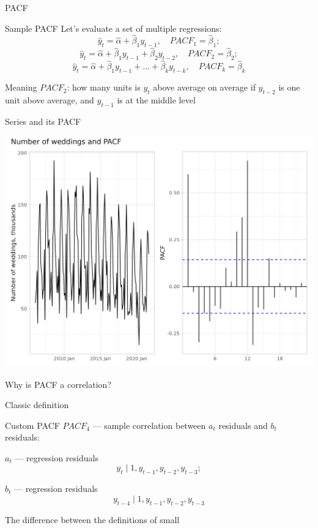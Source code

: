 \begin{frame}{PACF}
	
	\begin{block}{Sample PACF}
		Let's evaluate a set of multiple regressions:
		\[
		\hat y_t = \hat\alpha + \hat\beta_1 y_{t-1}, \quad PACF_1 = \hat\beta_1;
		\]
		\pause
		\[
		\hat y_t = \hat\alpha + \hat\beta_1 y_{t-1} + \hat\beta_2 y_{t-2}, \quad PACF_2 = \hat\beta_2;
		\]
		\pause
		\[
		\hat y_t = \hat\alpha + \hat\beta_1 y_{t-1} + \ldots + \hat\beta_k y_{t-k}, \quad PACF_k = \hat\beta_k
		\]
	\end{block}
	
	\pause
	\alert{Meaning}
	$PACF_2$: how many units is $y_t$ above average on average if $y_{t-2}$ is one unit above average,
	and $y_{t-1}$ is at the middle level
	
\end{frame}

\begin{frame}{Series and its PACF}
	
	\includegraphics[width=\textwidth]{pictures/om_ts_01-127.png}
	
\end{frame}

\begin{frame}{Why is PACF a correlation?}
	
	\alert{Classic definition}
	
	\begin{block}{Custom PACF}
		$PACF_4$ — sample correlation between $a_t$ residuals and $b_t$ residuals:
		
		$a_t$ — regression residuals
		\[
		y_t \mid 1, y_{t-1}, y_{t-2}, y_{t-3};
		\]
		
		$b_t$ — regression residuals
		\[
		y_{t-4} \mid 1, y_{t-1}, y_{t-2}, y_{t-3}
		\]
	\end{block}
	
	\pause
	The difference between the definitions of \alert{small}
	
\end{frame}


